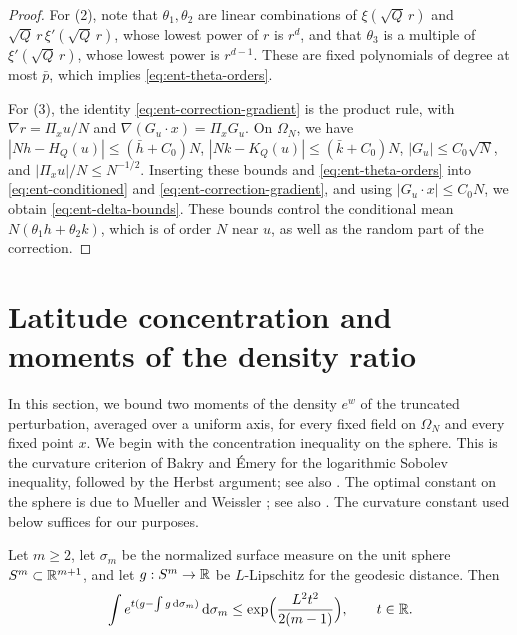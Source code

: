 \begin{proof}
For (2), note that $\theta_1,\theta_2$ are linear combinations of
$\xi(\sqrt Q\,r)$ and $\sqrt Q\,r\,\xi'(\sqrt Q\,r)$, whose lowest power of
$r$ is $r^d$, and that $\theta_3$ is a multiple of $\xi'(\sqrt Q\,r)$, whose
lowest power is $r^{d-1}$. These are fixed polynomials of degree at most
$\bar p$, which implies \eqref{eq:ent-theta-orders}.

For (3), the identity \eqref{eq:ent-correction-gradient} is the product rule,
with $\nabla r=\Pi_xu/N$ and $\nabla(G_u\cdot x)=\Pi_xG_u$. On
$\Omega_N$, we have $|Nh-H_Q(u)|\le(\bar h+C_0)N$, $|Nk-K_Q(u)|\le
(\bar k+C_0)N$, $|G_u|\le C_0\sqrt N$, and $|\Pi_xu|/N\le N^{-1/2}$.
Inserting these bounds and \eqref{eq:ent-theta-orders} into
\eqref{eq:ent-conditioned} and \eqref{eq:ent-correction-gradient}, and using
$|G_u\cdot x|\le C_0N$, we obtain \eqref{eq:ent-delta-bounds}. These bounds
control the conditional mean $N(\theta_1h+\theta_2k)$, which is of order $N$
near $u$, as well as the random part of the correction.
\end{proof}

\section{Latitude concentration and moments of the density ratio}
\label{sec:ent-multipliers}

In this section, we bound two moments of the density $e^w$ of the
truncated perturbation, averaged over a uniform axis, for every fixed field
on $\Omega_N$ and every fixed point $x$. We begin with the concentration
inequality on the sphere. This is the curvature criterion of Bakry and \'Emery
\cite[Corollary~2, p.~199; Example~(b), p.~200]{BakryEmery1985} for the
logarithmic Sobolev inequality, followed by the Herbst argument; see also
\cite[Sections~5.4 and~5.7]{BakryGentilLedoux2014}.
The optimal constant on the sphere is due to Mueller and Weissler
\cite{MuellerWeissler1982}; see also \cite[p.~200]{BakryEmery1985}. The
curvature constant used below suffices for our purposes.

\begin{lemma}\label{lem:ent-lsi}
Let $m\ge2$, let $\sigma_m$ be the normalized surface measure on the unit
sphere $S^m\subset\mathbb R^{m+1}$, and let $g:S^m\to\mathbb R$ be $L$-Lipschitz for the
geodesic distance. Then
\begin{equation}\label{eq:ent-subgaussian}
 \int e^{t(g-\int g\,\mathrm d\sigma_m)}\,\mathrm d\sigma_m
 \le\exp\Bigl(\frac{L^2t^2}{2(m-1)}\Bigr),\qquad t\in\mathbb R .
\end{equation}
\end{lemma}

